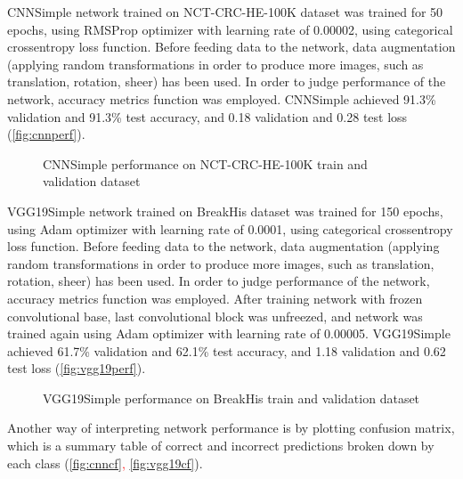 CNNSimple network trained on NCT-CRC-HE-100K dataset was trained for 50 epochs, using RMSProp optimizer with learning rate of 0.00002, using categorical crossentropy loss function. Before feeding data to the network, data augmentation (applying random transformations in order to produce more images, such as translation, rotation, sheer) has been used. In order to judge performance of the network, accuracy metrics function was employed. CNNSimple achieved 91.3\% validation and 91.3\% test accuracy, and 0.18 validation and 0.28 test loss (\textcolor{red}{\autoref{fig:cnnperf}}).

\begin{figure}[h]
	\centering
	\caption{CNNSimple performance on NCT-CRC-HE-100K train and validation dataset}
	\label{fig:cnnperf}
\end{figure}

\clearpage
VGG19Simple network trained on BreakHis dataset was trained for 150 epochs, using Adam optimizer with learning rate of 0.0001, using categorical crossentropy loss function. Before feeding data to the network, data augmentation (applying random transformations in order to produce more images, such as translation, rotation, sheer) has been used. In order to judge performance of the network, accuracy metrics function was employed. After training network with frozen convolutional base, last convolutional block was unfreezed, and network was trained again using Adam optimizer with learning rate of 0.00005. VGG19Simple achieved 61.7\% validation and 62.1\% test accuracy, and 1.18 validation and 0.62 test loss (\textcolor{red}{\autoref{fig:vgg19perf}}).

\begin{figure}[h]
	\centering
	\caption{VGG19Simple performance on BreakHis train and validation dataset}
	\label{fig:vgg19perf}
\end{figure}

Another way of interpreting network performance is by plotting confusion matrix, which is a summary table of correct and incorrect predictions broken down by each class (\textcolor{red}{\autoref{fig:cnncf}, \autoref{fig:vgg19cf}}).

